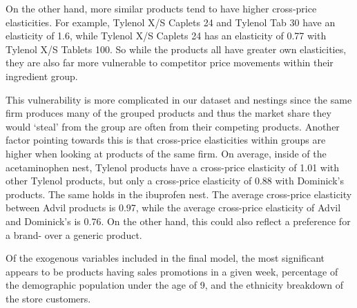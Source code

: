 \documentclass[12pt, authoryear]{elsarticle}
\begin{document}
On the other hand, more similar products tend to have higher cross-price elasticities. For example, Tylenol X/S Caplets 24 and Tylenol Tab 30 have an elasticity of 1.6, while Tylenol X/S Caplets 24 has an elasticity of 0.77 with Tylenol X/S Tablets 100. So while the products all have greater own elasticities, they are also far more vulnerable to competitor price movements within their ingredient group. 

This vulnerability is more complicated in our dataset and nestings since the same firm produces many of the grouped products and thus the market share they would ‘steal’ from the group are often from their competing products. Another factor pointing towards this is that cross-price elasticities within groups are higher when looking at products of the same firm. On average, inside of the acetaminophen nest, Tylenol products have a cross-price elasticity of 1.01 with other Tylenol products, but only a cross-price elasticity of 0.88 with Dominick’s products. The same holds in the ibuprofen nest. The average cross-price elasticity between Advil products is 0.97, while the average cross-price elasticity of Advil and Dominick’s is 0.76. On the other hand, this could also reflect a preference for a brand- over a generic product.

Of the exogenous variables included in the final model, the most significant appears to be products having sales promotions in a given week, percentage of the demographic population under the age of 9, and the ethnicity breakdown of the store customers.
\end{document}
